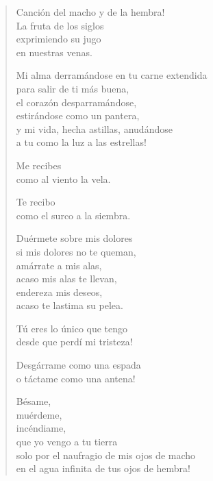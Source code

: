 \documentclass[12pt]{article}
\begin{document}
\clearpage
{}
\begin{verse}

Canción del macho y de la hembra!\\
La fruta de los siglos\\
exprimiendo su jugo\\
en nuestras venas.  

Mi alma derramándose en tu carne extendida\\
para salir de ti más buena,\\
el corazón desparramándose,\\
estirándose como un pantera,\\
y mi vida, hecha astillas, anudándose\\
a tu como la luz a las estrellas!  

Me recibes\\
como al viento la vela.  

Te recibo\\
como el surco a la siembra.  

Duérmete sobre mis dolores\\
si mis dolores no te queman,\\
amárrate a mis alas,\\
acaso mis alas te llevan,\\
endereza mis deseos,\\
acaso te lastima su pelea.  

Tú eres lo único que tengo\\
desde que perdí mi tristeza!  

Desgárrame como una espada\\
o táctame como una antena!  

Bésame,\\
muérdeme,\\
incéndiame,\\
que yo vengo a tu tierra\\
solo por el naufragio de mis ojos de macho\\
en el agua infinita de tus ojos de hembra!

\end{verse}
\end{document}

